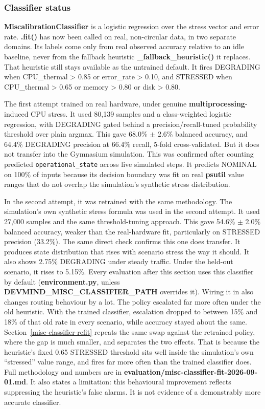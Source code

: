 \hypertarget{classifier-status}{%
\subsubsection{Classifier status}\label{classifier-status}}

\textbf{MiscalibrationClassifier} is a logistic regression over the
stress vector and error rate. \textbf{.fit()} has now been called on
real, non-circular data, in two separate domains. Its labels come only
from real observed accuracy relative to an idle baseline, never from
the fallback heuristic \textbf{\_fallback\_heuristic()} it replaces.
That heuristic still stays available as the untrained default. It fires
DEGRADING when CPU\_thermal \textgreater{} 0.85 or error\_rate
\textgreater{} 0.10, and STRESSED when CPU\_thermal \textgreater{} 0.65
or memory \textgreater{} 0.80 or disk \textgreater{} 0.80.

The first attempt trained on real hardware, under genuine
\textbf{multiprocessing}-induced CPU stress. It used 80,139 samples and
a class-weighted logistic regression, with DEGRADING gated behind a
precision/recall-tuned probability threshold over plain argmax.
This gave 68.0\% $\pm$ 2.6\% balanced accuracy, and 64.4\% DEGRADING
precision at 66.4\% recall, 5-fold cross-validated. But it does not
transfer into the Gymnasium simulation. This was confirmed after
counting predicted \texttt{operational\_state} across live simulated
steps. It predicts NOMINAL on 100\% of inputs because its
decision boundary was fit on real \textbf{psutil} value ranges that do
not overlap the simulation's synthetic stress distribution.

In the second attempt, it was retrained with the same methodology. The
simulation's own synthetic stress formula was used in the second attempt.
It used 27,000 samples and the same threshold-tuning approach. This gave 
54.6\% $\pm$ 2.0\% balanced accuracy, weaker than the real-hardware fit, 
particularly on STRESSED precision (33.2\%). The same direct check confirms
this one does transfer. It produces state
distribution that rises with scenario stress the way it should. It also shows
2.75\% DEGRADING under steady traffic. Under the held-out scenario, it rises 
to 5.15\%. Every evaluation after this section uses this classifier
by default (\textbf{environment.py}, unless \textbf{DEVMIND\_MISC\_CLASSIFIER\_PATH}
overrides it). Wiring it in also changes routing behaviour by a lot. The policy
escalated far more often under the old heuristic. With the trained classifier,
escalation dropped to between 15\% and 18\% of that old rate in every scenario,
while accuracy stayed about the same. Section~\ref{misc-classifier-refit} repeats
the same swap against the retrained policy, where the gap is much
smaller, and separates the two effects. That is because the heuristic's fixed 0.65
STRESSED threshold sits well inside the simulation's own ``stressed''
value range, and fires far more often than the trained classifier does.
Full methodology and numbers are in
\textbf{evaluation/misc-classifier-fit-2026-09-01.md}. It also states a
limitation: this behavioural improvement reflects suppressing the
heuristic's false alarms. It is not evidence of a demonstrably more
accurate classifier.

